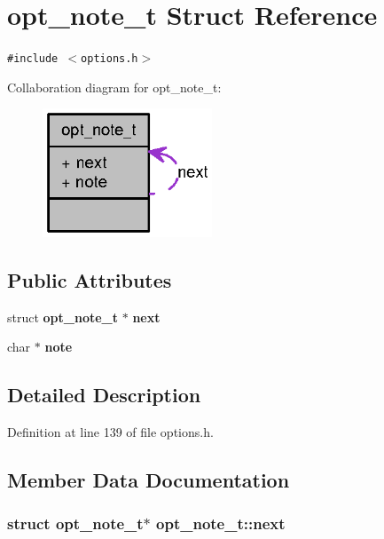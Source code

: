 \section{opt\_\-note\_\-t Struct Reference}
\label{structopt__note__t}
{\tt \#include $<$options.h$>$}

Collaboration diagram for opt\_\-note\_\-t:\nopagebreak
\begin{figure}[H]
\begin{center}
\leavevmode
\includegraphics[width=143pt]{structopt__note__t__coll__graph}
\end{center}
\end{figure}
\subsection*{Public Attributes}
\begin{CompactItemize}
\item 
struct {\bf opt\_\-note\_\-t} $\ast$ {\bf next}
\item 
char $\ast$ {\bf note}
\end{CompactItemize}


\subsection{Detailed Description}


Definition at line 139 of file options.h.

\subsection{Member Data Documentation}
\subsubsection[{next}]{\setlength{\rightskip}{0pt plus 5cm}struct {\bf opt\_\-note\_\-t}$\ast$ {\bf opt\_\-note\_\-t::next}\hspace{0.3cm}{\tt  [read]}}\label{structopt__note__t_6ce83f33c045e8794aff05cc7d1a1899}




